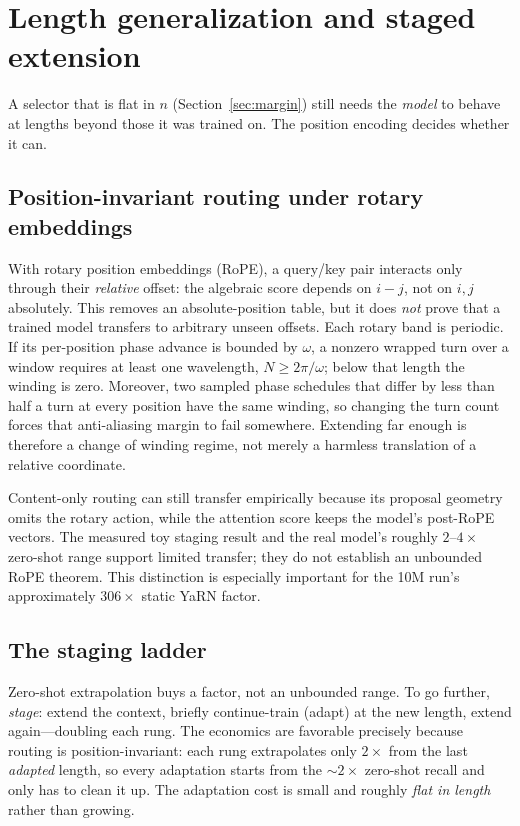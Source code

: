 \documentclass[11pt]{article}
\numberwithin{equation}{section}
\begin{document}
\section{Length generalization and staged extension}\label{sec:length}

A selector that is flat in $n$ (Section~\ref{sec:margin}) still needs the \emph{model} to behave at lengths
beyond those it was trained on. The position encoding decides whether it can.

\subsection{Position-invariant routing under rotary embeddings}

With rotary position embeddings (RoPE), a query/key pair interacts only through their \emph{relative} offset:
the algebraic score depends on $i-j$, not on $i,j$ absolutely. This removes an absolute-position table, but it
does \emph{not} prove that a trained model transfers to arbitrary unseen offsets. Each rotary band is periodic.
If its per-position phase advance is bounded by $\omega$, a nonzero wrapped turn over a window requires at
least one wavelength, $N\ge2\pi/\omega$; below that length the winding is zero. Moreover, two sampled phase
schedules that differ by less than half a turn at every position have the same winding, so changing the turn
count forces that anti-aliasing margin to fail somewhere. Extending far enough is therefore a change of
winding regime, not merely a harmless translation of a relative coordinate.

Content-only routing can still transfer empirically because its proposal geometry omits the rotary action,
while the attention score keeps the model's post-RoPE vectors. The measured toy staging result and the real
model's roughly $2$--$4\times$ zero-shot range support limited transfer; they do not establish an unbounded
RoPE theorem. This distinction is especially important for the 10M run's approximately $306\times$ static
YaRN factor.

\subsection{The staging ladder}

Zero-shot extrapolation buys a factor, not an unbounded range. To go further, \emph{stage}: extend the context,
briefly continue-train (adapt) at the new length, extend again---doubling each rung. The economics are
favorable precisely because routing is position-invariant: each rung extrapolates only $2\times$ from the last
\emph{adapted} length, so every adaptation starts from the ${\sim}2\times$ zero-shot recall and only has to
clean it up. The adaptation cost is small and roughly \emph{flat in length} rather than growing.
\end{document}
